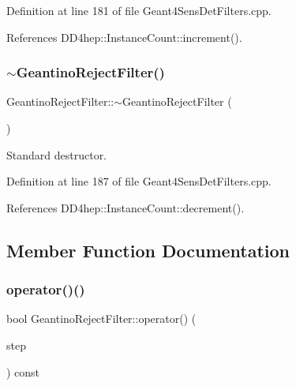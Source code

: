 Definition at line 181 of file Geant4\+Sens\+Det\+Filters.\+cpp.



References D\+D4hep\+::\+Instance\+Count\+::increment().

\hypertarget{struct_d_d4hep_1_1_simulation_1_1_geantino_reject_filter_a566d0c7a2368a3358c321279be8ac3ae}{}\label{struct_d_d4hep_1_1_simulation_1_1_geantino_reject_filter_a566d0c7a2368a3358c321279be8ac3ae} 
\subsubsection{\texorpdfstring{$\sim$\+Geantino\+Reject\+Filter()}{~GeantinoRejectFilter()}}
{\footnotesize\ttfamily Geantino\+Reject\+Filter\+::$\sim$\+Geantino\+Reject\+Filter (\begin{DoxyParamCaption}{ }\end{DoxyParamCaption})\hspace{0.3cm}{\ttfamily [virtual]}}



Standard destructor. 



Definition at line 187 of file Geant4\+Sens\+Det\+Filters.\+cpp.



References D\+D4hep\+::\+Instance\+Count\+::decrement().



\subsection{Member Function Documentation}
\hypertarget{struct_d_d4hep_1_1_simulation_1_1_geantino_reject_filter_a6237d315bdb20d7248dc09afc4866a3b}{}\label{struct_d_d4hep_1_1_simulation_1_1_geantino_reject_filter_a6237d315bdb20d7248dc09afc4866a3b} 
\subsubsection{\texorpdfstring{operator()()}{operator()()}}
{\footnotesize\ttfamily bool Geantino\+Reject\+Filter\+::operator() (\begin{DoxyParamCaption}\item[{const G4\+Step $\ast$}]{step }\end{DoxyParamCaption}) const\hspace{0.3cm}{\ttfamily [virtual]}}



